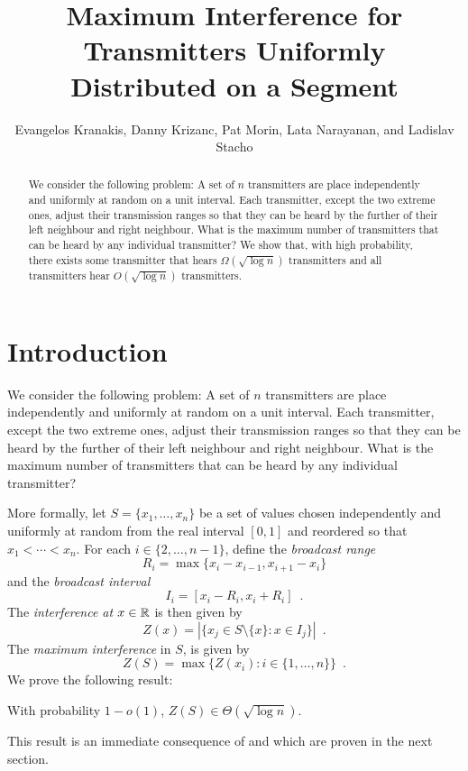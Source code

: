 \documentclass{patmorin}
\title{Maximum Interference for Transmitters Uniformly Distributed on a Segment}
\author{Evangelos Kranakis, Danny Krizanc, Pat Morin, Lata Narayanan, and Ladislav Stacho}
\begin{document}
\maketitle

\begin{abstract}
We consider the following problem: A set of $n$ transmitters are
place independently and uniformly at random on a unit interval.  Each
transmitter, except the two extreme ones, adjust their transmission ranges
so that they can be heard by the further of their left neighbour and right
neighbour.  What is the maximum number of transmitters that can be heard
by any individual transmitter?  We show that, with high probability,
there exists some transmitter that hears $\Omega(\sqrt{\log n})$
transmitters and all transmitters hear $O(\sqrt{\log n})$ transmitters.
\end{abstract}

\section{Introduction}

We consider the following problem: A set of $n$ transmitters are
place independently and uniformly at random on a unit interval.  Each
transmitter, except the two extreme ones, adjust their transmission ranges
so that they can be heard by the further of their left neighbour and right
neighbour.  What is the maximum number of transmitters that can be heard
by any individual transmitter? 

More formally, let $S=\{x_1,\ldots,x_n\}$ be a set of values chosen
independently and uniformly at random from the real interval $[0,1]$
and reordered so that $x_1<\cdots<x_n$.  For each $i\in\{2,\ldots,n-1\}$,
define the \emph{broadcast range}
\[
   R_i = \max\{x_i - x_{i-1}, x_{i+1}-x_i\}
\]
and the \emph{broadcast interval}
\[
   I_i = [x_i-R_i,x_i+R_i] \enspace .
\]
The \emph{interference at $x\in\mathbb{R}$} is then given by
\[
   Z(x) = |\{x_j\in S\setminus\{x\}: x \in I_j\}| \enspace .
\]
The \emph{maximum interference} in $S$, is given by
\[
   Z(S)=\max\{Z(x_i):i\in\{1,\ldots,n\}\} \enspace .
\]
We prove the following result:

\begin{thm}
With probability $1-o(1)$, $Z(S)\in \Theta(\sqrt{\log n})$.
\end{thm}

This result is an immediate consequence of  and
 which are proven in the next section.
\end{document}
